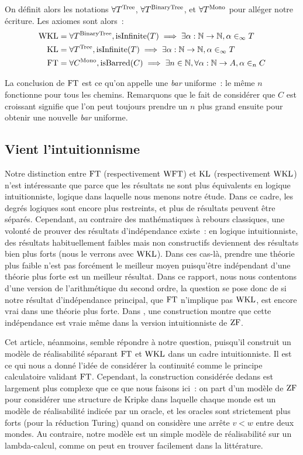 \documentclass{article}
\begin{document}
On définit alors les notations $\forall T^{\mathrm{Tree}}$, $\forall T^{\mathrm{BinaryTree}}$, et $\forall T^{\mathrm{Mono}}$ pour alléger notre écriture. Les axiomes sont alors~:
\begin{align*}
    \mathrm{WKL} &= \forall T^{\mathrm{BinaryTree}}, \mathrm{isInfinite}(T) \implies \exists \alpha : \mathbb{N} \to \mathbb{N}, \alpha\in_\infty T\\
    \mathrm{KL} &= \forall T^{\mathrm{Tree}},\mathrm{isInfinite}(T) \implies \exists \alpha : \mathbb{N}\to\mathbb{N}, \alpha \in_\infty T\\
    \mathrm{FT} &= \forall C^{\mathrm{Mono}},\mathrm{isBarred}(C) \implies \exists n \in \mathbb{N}, \forall \alpha : \mathbb{N} \to A, \alpha \in_n C
\end{align*}

La conclusion de $\mathrm{FT}$ est ce qu'on appelle une \textit{bar} uniforme~: le même $n$ fonctionne pour tous les chemins. Remarquons que le fait de considérer que $C$ est croissant signifie que l'on peut toujours prendre un $n$ plus grand ensuite pour obtenir une nouvelle \textit{bar} uniforme.

\subsection{Vient l'intuitionnisme}

Notre distinction entre $\mathrm{FT}$ (respectivement $\mathrm{WFT}$) et $\mathrm{KL}$ (respectivement $\mathrm{WKL}$) n'est intéressante que parce que les résultats ne sont plus équivalents en logique intuitionniste, logique dans laquelle nous menons notre étude. Dans ce cadre, les degrés logiques sont encore plus restreints, et plus de résultats peuvent être séparés. Cependant, au contraire des mathématiques à rebours classiques, une volonté de prouver des résultats d'indépendance existe~: en logique intuitionniste, des résultats habituellement faibles mais non constructifs deviennent des résultats bien plus forts (nous le verrons avec $\mathrm{WKL}$). Dans ces cas-là, prendre une théorie plus faible n'est pas forcément le meilleur moyen puisqu'être indépendant d'une théorie plus forte est un meilleur résultat. Dans ce rapport, nous nous contentons d'une version de l'arithmétique du second ordre, la question se pose donc de si notre résultat d'indépendance principal, que $\mathrm{FT}$ n'implique pas $\mathrm{WKL}$, est encore vrai dans une théorie plus forte. Dans \cite{lubarsky2015realizabilitymodelsseparatingvarious}, une construction montre que cette indépendance est vraie même dans la version intuitionniste de $\mathrm{ZF}$.

Cet article, néanmoins, semble répondre à notre question, puisqu'il construit un modèle de réalisabilité séparant $\mathrm{FT}$ et $\mathrm{WKL}$ dans un cadre intuitionniste. Il est ce qui nous a donné l'idée de considérer la continuité comme le principe calculatoire validant $\mathrm{FT}$. Cependant, la construction considérée dedans est largement plus complexe que ce que nous faisons ici~: on part d'un modèle de $\mathrm{ZF}$ pour considérer une structure de Kripke dans laquelle chaque monde est un modèle de réalisabilité indicée par un oracle, et les oracles sont strictement plus forts (pour la réduction Turing) quand on considère une arrête $v < w$ entre deux mondes. Au contraire, notre modèle est un simple modèle de réalisabilité sur un lambda-calcul, comme on peut en trouver facilement dans la littérature.
\end{document}
